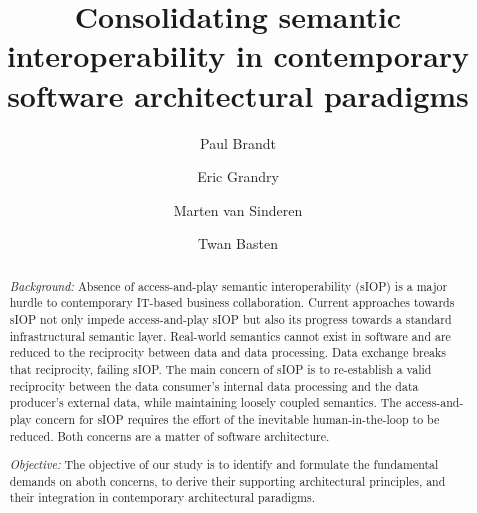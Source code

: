 \documentclass[sort&compress,preprint,authoryear,3p,twocolumn]{elsarticle}
\begin{document}
\begin{frontmatter}

  \title{Consolidating semantic interoperability in contemporary
software architectural paradigms}

  \author[1]{Paul
Brandt}   \author[2]{Eric
Grandry}   \author[4]{Marten
van
Sinderen}   \author[1,3]{Twan
Basten}%

    

\begin{abstract}
\emph{Background:} Absence of access-and-play semantic interoperability
(sIOP) is a major hurdle to contemporary IT-based business
collaboration. Current approaches towards sIOP not only impede
access-and-play sIOP but also its progress towards a standard
infrastructural semantic layer. Real-world semantics cannot exist in
software and are reduced to the reciprocity between data and data
processing. Data exchange breaks that reciprocity, failing sIOP. The
main concern of sIOP is to re-establish a valid reciprocity between the
data consumer's internal data processing and the data producer's
external data, while maintaining loosely coupled semantics. The
access-and-play concern for sIOP requires the effort of the inevitable
human-in-the-loop to be reduced. Both concerns are a matter of software
architecture.

\emph{Objective:} The objective of our study is to identify and
formulate the fundamental demands on aboth concerns, to derive their
supporting architectural principles, and their integration in
contemporary architectural paradigms.


\end{abstract}
\end{frontmatter}
\end{document}
